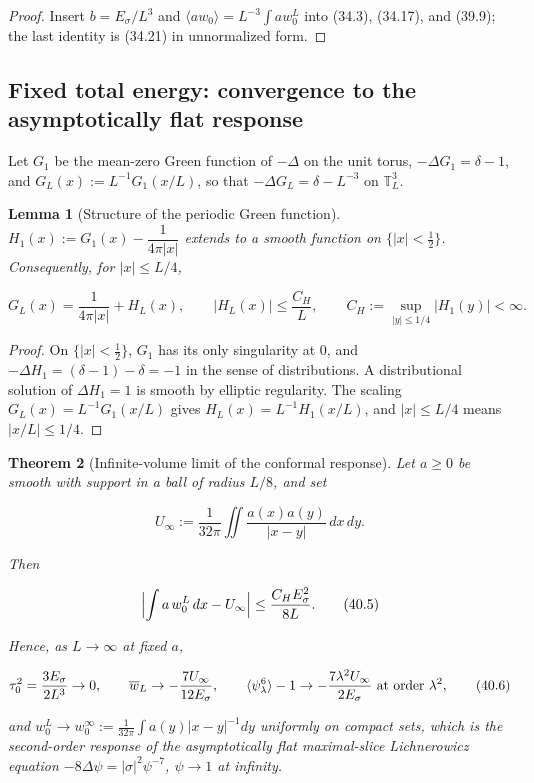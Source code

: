 \documentclass[11pt]{article}
\newtheorem{theorem}{Theorem}[section]
\newtheorem{lemma}[theorem]{Lemma}
\theoremstyle{remark}
\begin{document}
\begin{proof}
Insert \(b=E_\sigma/L^3\) and \(\langle aw_0\rangle=L^{-3}\int aw_0^L\)
into (34.3), (34.17), and (39.9); the last identity is (34.21) in
unnormalized form.
\end{proof}

\subsection{Fixed total energy: convergence to the asymptotically flat response}

Let \(G_1\) be the mean-zero Green function of \(-\Delta\) on the unit
torus, \(-\Delta G_1=\delta-1\), and \(G_L(x):=L^{-1}G_1(x/L)\), so that
\(-\Delta G_L=\delta-L^{-3}\) on \(\mathbb T^3_L\).

\begin{lemma}[Structure of the periodic Green function]
\label{lem:v19v37-green}
\(H_1(x):=G_1(x)-\dfrac1{4\pi|x|}\) extends to a smooth function on
\(\{|x|<\tfrac12\}\).  Consequently, for \(|x|\leq L/4\),

\[
 G_L(x)=\frac1{4\pi|x|}+H_L(x),\qquad
 |H_L(x)|\leq\frac{C_H}{L},\qquad
 C_H:=\sup_{|y|\leq1/4}|H_1(y)|<\infty.                             \tag{40.3}
\]
\end{lemma}

\begin{proof}
On \(\{|x|<\tfrac12\}\), \(G_1\) has its only singularity at \(0\), and
\(-\Delta H_1=(\delta-1)-\delta=-1\) in the sense of distributions.  A
distributional solution of \(\Delta H_1=1\) is smooth by elliptic
regularity.  The scaling \(G_L(x)=L^{-1}G_1(x/L)\) gives
\(H_L(x)=L^{-1}H_1(x/L)\), and \(|x|\leq L/4\) means \(|x/L|\leq1/4\).
\end{proof}

\begin{theorem}[Infinite-volume limit of the conformal response]
\label{thm:v19v37-limit}
Let \(a\geq0\) be smooth with support in a ball of radius \(L/8\),
and set

\[
 U_\infty:=\frac1{32\pi}\iint\frac{a(x)a(y)}{|x-y|}\,dx\,dy.          \tag{40.4}
\]

Then

\[
 \Bigl|\int a\,w_0^L\,dx-U_\infty\Bigr|\leq\frac{C_HE_\sigma^2}{8L}.
                                                                    \tag{40.5}
\]

Hence, as \(L\to\infty\) at fixed \(a\),

\[
 \tau_0^2=\frac{3E_\sigma}{2L^3}\to0,\qquad
 \overline w_L\to-\frac{7U_\infty}{12E_\sigma},\qquad
 \langle\psi_\lambda^6\rangle-1\to-\frac{7\lambda^2U_\infty}{2E_\sigma}
 \ \hbox{at order }\lambda^2,                                       \tag{40.6}
\]

and \(w_0^L\to w_0^\infty:=\tfrac1{32\pi}\int a(y)|x-y|^{-1}dy\)
uniformly on compact sets, which is the second-order response of the
asymptotically flat maximal-slice Lichnerowicz equation
\(-8\Delta\psi=|\sigma|^2\psi^{-7}\), \(\psi\to1\) at infinity.
\end{theorem}
\end{document}
